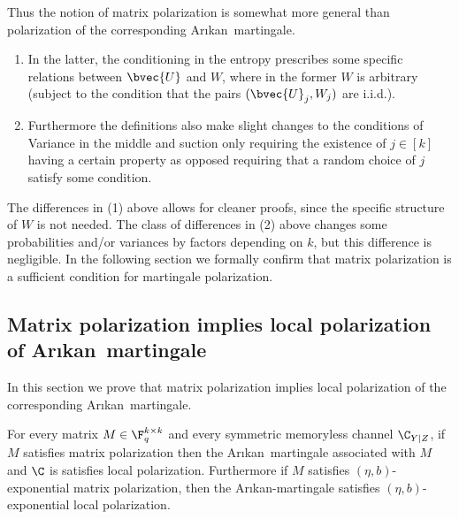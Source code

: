 \documentclass[11pt]{article}
\newcommand{\Arikan}{Ar\i kan}
\begin{document}
Thus the notion of matrix polarization is somewhat more general than polarization of the corresponding \Arikan\ martingale. 
\begin{enumerate}
	\item[(1)] In the latter, the conditioning in the entropy prescribes some specific relations between $\bvec{U}$ and $W$, where in the former $W$ is arbitrary (subject to the condition that the pairs $(\bvec{U}_j,W_j)$ are i.i.d.).
	\item[(2)] Furthermore the definitions also make slight changes to the conditions of Variance in the middle and suction only requiring the existence of $j \in [k]$ having a certain property as opposed requiring that a random choice of $j$ satisfy some condition. 
\end{enumerate} 

The differences in (1) above allows for cleaner proofs, since the specific structure of $W$ is not needed. The class of differences in (2) above changes some probabilities and/or variances by factors depending on $k$, but this difference is negligible. In the following section we formally confirm that matrix polarization is a sufficient condition for martingale polarization.

\subsection{Matrix polarization implies local polarization of \Arikan~martingale}
\label{ssec:proof-local}



In  this section we prove that matrix polarization implies local polarization of the corresponding \Arikan\ martingale.



\begin{theorem}
	\label{lem:polarizing-matrix-implies-martingale}
	For every  matrix $M\in \F_q^{k \times k}$ and every symmetric memoryless channel $\C_{Y|Z}$, if $M$ satisfies matrix polarization then the \Arikan~martingale associated with $M$ and $\C$ is satisfies local polarization. Furthermore if $M$ satisfies $(\eta,b)$-exponential matrix polarization, then the \Arikan-martingale satisfies $(\eta,b)$-exponential local polarization. 
\end{theorem}
\end{document}
